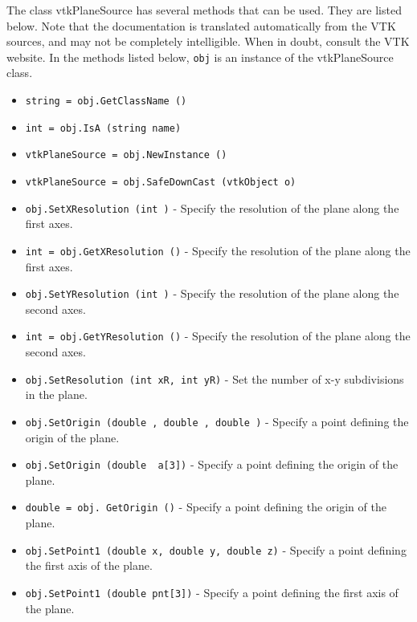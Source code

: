 The class vtkPlaneSource has several methods that can be used.
  They are listed below.
Note that the documentation is translated automatically from the VTK sources,
and may not be completely intelligible.  When in doubt, consult the VTK website.
In the methods listed below, \verb|obj| is an instance of the vtkPlaneSource class.
\begin{itemize}
\item  \verb|string = obj.GetClassName ()|

\item  \verb|int = obj.IsA (string name)|

\item  \verb|vtkPlaneSource = obj.NewInstance ()|

\item  \verb|vtkPlaneSource = obj.SafeDownCast (vtkObject o)|

\item  \verb|obj.SetXResolution (int )| -  Specify the resolution of the plane along the first axes.

\item  \verb|int = obj.GetXResolution ()| -  Specify the resolution of the plane along the first axes.

\item  \verb|obj.SetYResolution (int )| -  Specify the resolution of the plane along the second axes.

\item  \verb|int = obj.GetYResolution ()| -  Specify the resolution of the plane along the second axes.

\item  \verb|obj.SetResolution (int xR, int yR)| -  Set the number of x-y subdivisions in the plane.

\item  \verb|obj.SetOrigin (double , double , double )| -  Specify a point defining the origin of the plane.

\item  \verb|obj.SetOrigin (double  a[3])| -  Specify a point defining the origin of the plane.

\item  \verb|double = obj. GetOrigin ()| -  Specify a point defining the origin of the plane.

\item  \verb|obj.SetPoint1 (double x, double y, double z)| -  Specify a point defining the first axis of the plane.

\item  \verb|obj.SetPoint1 (double pnt[3])| -  Specify a point defining the first axis of the plane.


\end{itemize}
